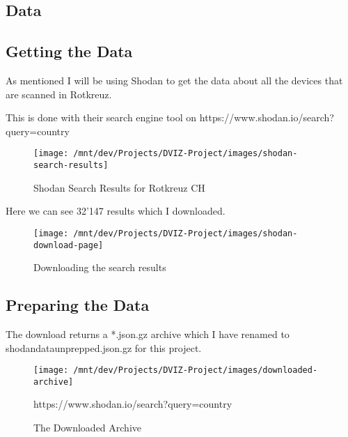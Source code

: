 \documentclass[11pt,a4paper]{article}
\begin{document}
\begin{data}
\section{Data}
\subsection{Getting the Data}

As mentioned I will be using Shodan to get the data about all the devices that are scanned in Rotkreuz.

This is done with their search engine tool on https://www.shodan.io/search?query=country%

\begin{figure}[!htb]
    \centering
    \texttt{[image: /mnt/dev/Projects/DVIZ-Project/images/shodan-search-results]}
    \caption{Shodan Search Results for Rotkreuz CH}
    \label{fig:shodan-search-results}
\end{figure}

Here we can see 32'147 results which I downloaded.

\begin{figure}[!htb]
    \centering
    \texttt{[image: /mnt/dev/Projects/DVIZ-Project/images/shodan-download-page]}
    \caption{Downloading the search results}
    \label{fig:shodan-download-page}
\end{figure}


\subsection{Preparing the Data}

The download returns a *.json.gz archive which I have renamed to shodan\textbf{\textunderscore}data\textbf{\textunderscore}unprepped.json.gz for this project.

\begin{figure}[!htb]
    \centering
    \texttt{[image: /mnt/dev/Projects/DVIZ-Project/images/downloaded-archive]}
    \caption{The Downloaded Archive}
    \label{fig:downloaded-archive}https://www.shodan.io/search?query=country%
\end{figure}


\end{data}
\end{document}

